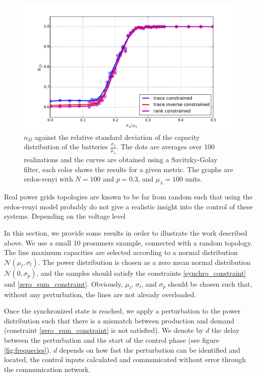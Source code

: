 \documentclass[conference]{IEEEtran}
\begin{document}
\begin{figure}
\label{fig:batteries_variance}
\includegraphics[scale=.37]{batteries_variance}
\caption{$n_D$ against the relative standard deviation of the capacity distribution of the batteries $ \frac{ \sigma_{ \lambda } }{ \mu_{ \lambda} } $. The dots are averages over 100 realizations and the curves are obtained using a Savitzky-Golay filter, each color shows the results for a given metric. The graphs are erdos-renyi with $N=100$ and $p=0.3$, and $\mu_{\lambda} = 100 $ units. }
\end{figure} 

Real power grids topologies are known to be far from random such that using the erdos-renyi model probably do not give a realistic insight into the control of these systems. Depending on the voltage level 

In this section, we provide some results in order to illustrate the work described above. We use a small 10 prosumers example, connected with a random topology. The line maximum capacities are selected  according to a normal distribution $\mathcal{N}(\mu_l,\sigma_l)$.  The power distribution is chosen as a zero mean normal distribution $ \mathcal{N}(0,\sigma_p) $, and the samples should satisfy the constraints \ref{synchro_constraint} and \ref{zero_sum_constraint}. Obviously, $\mu_l$, $\sigma_l$, and $\sigma_p$ should be chosen such that, without any perturbation, the lines are not already overloaded.



Once the synchronized state is reached, we apply a perturbation to the power distribution such that there is a mismatch between production and demand (constraint \ref{zero_sum_constraint} is not satisfied). We denote by $d$ the delay between the perturbation and the start of the control phase (see figure \ref{fig:frequecies}). $d$ depends on how fast the perturbation can be identified and located, the control inputs calculated and communicated without error through the communication network.
\end{document}

